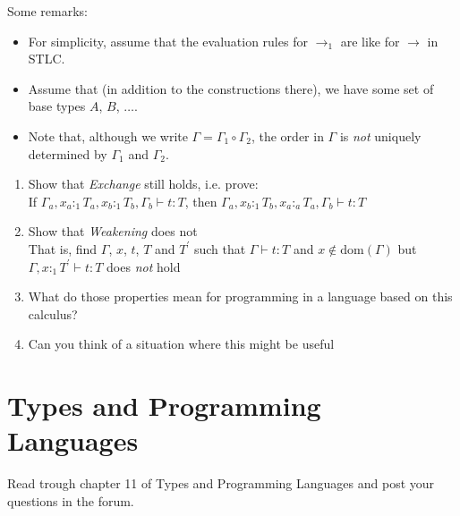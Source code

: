 \begin{prooftree}
\end{prooftree}
Some remarks:
\begin{itemize}
  \item For simplicity, assume that the evaluation rules for $\rightarrow_1$ are like for $\rightarrow$ in STLC.
  \item Assume that (in addition to the constructions there), we have some set of base types $A$, $B$, $\dots$.
  \item Note that, although we write \(\Gamma = \Gamma_1\circ\Gamma_2\), the order in \(\Gamma\) is \emph{not}
    uniquely determined by \(\Gamma_1\) and \(\Gamma_2\).
\end{itemize}


\begin{enumerate}
  \item Show that \emph{Exchange} still holds, i.e. prove: \\
    If $\Gamma_a,x_a:_1 T_a, x_b :_1 T_b, \Gamma_b\vdash t:T$, then 
    $\Gamma_a, x_b:_1 T_b, x_a:_a T_a, \Gamma_b \vdash t:T$
  \item Show that \emph{Weakening} does not\\
    That is, find $\Gamma$, $x$, $t$, $T$ and $T^{\prime}$ such that 
    $\Gamma\vdash t:T$ and $x\notin\mathrm{dom}(\Gamma)$ but
    $\Gamma, x:_1 T^{\prime}\vdash t:T$ does \emph{not} hold
  \item What do those properties mean for programming in a language based on this calculus?
  \item Can you think of a situation where this might be useful
\end{enumerate}

\section{Types and Programming Languages}
Read trough chapter 11 of Types and Programming Languages and post your questions in the forum.
